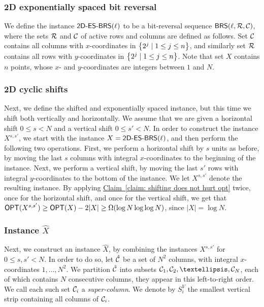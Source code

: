 \documentclass[11pt]{article}
\numberwithin{equation}{section}
\theoremstyle{definition}
\theoremstyle{plain}
\newcommand{\expref}[2]{\hyperref[#2]{#1~\ref{#2}}}
\begin{document}
\subsubsection{2D exponentially spaced bit reversal} 

We define the instance $\mbox{\sf 2D-ES-BRS}(\ell)$ to be a bit-reversal sequence $\mathsf{BRS}(\ell,{\mathcal R},{\mathcal C})$, where the sets ${\mathcal R}$ and ${\mathcal C}$ of active rows and columns are defined as follows. Set ${\mathcal C}$ contains all columns with $x$-coordinates in $\left\{ 2^j\mid 1\leq j\leq n \right\}$, and similarly set ${\mathcal R}$ contains all rows with $y$-coordinates in $\left\{ 2^j\mid 1\leq j\leq n \right\}$. Note that set $X$ contains $n$ points, whose $x$- and $y$-coordinates are integers between $1$ and $N$.


 

%
%
	
	
\subsubsection{2D cyclic shifts} 

Next, we define the shifted and exponentially spaced instance, but this time we shift both vertically and horizontally. 
We assume that we are given a horizontal shift $0\leq s<N$ and a vertical shift $0\leq s'<N$. 
In order to construct the instance $X^{s,s'}$, we start with the instance $X=\mbox{\sf 2D-ES-BRS}(\ell)$, and then perform the following two operations. 
First, we perform a horizontal shift by $s$ units as before, by moving the last $s$ columns with integral $x$-coordinates  to the beginning of the instance. 
Next, we perform a vertical shift, by moving the last $s'$ rows with integral $y$-coordinates to the bottom of the instance. 
We let $X^{s,s'}$ denote the resulting instance. 
By applying \expref{Claim}{claim: shifting does not hurt opt} twice, once for the horizontal shift, and once for the vertical shift, we get that $\mbox{\sf OPT}(X^{s,s'})\geq \mbox{\sf OPT}(X)-2|X|\geq \Omega(\log N\log\log N)$, since $|X|=\log N$.




\subsubsection{Instance $\hat{X}$} 

Next, we construct an instance $\hat X$, by combining the instances $X^{s,s'}$ for $0\leq s,s'<N$. 
In order to do so, let $\hat {{\mathcal C}}$ be a set of $N^2$ columns, with integral $x$-coordinates $1,\ldots,N^2$. We partition $\hat {{\mathcal C}}$ into subsets $\cset_1, \cset_2,\ldots,\cset_N$, each of which contains $N$ consecutive columns, they appear in this left-to-right order. 
We call each such set ${\mathcal C}_i$ a \emph{super-column}. We denote by $S^V_i$ the smallest vertical strip containing all columns of ${\mathcal C}_i$.
\end{document}
